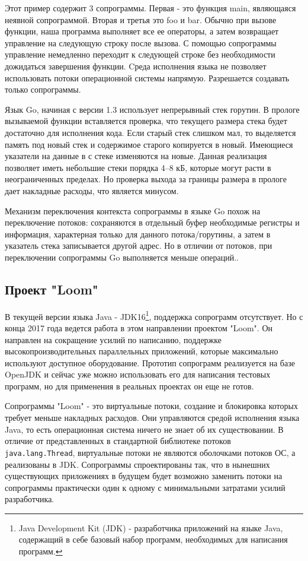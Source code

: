 	Этот пример содержит 3 сопрограммы. Первая - это функция main, являющаяся
	неявной сопрограммой. Вторая и третья это foo и bar. Обычно при вызове функции, наша программа 
	выполняет все ее операторы, а затем возвращает управление на следующую строку после вызова. 
	С помощью сопрограммы управление немедленно переходит к следующей строке без необходимости дожидаться завершения функции. Cреда исполнения языка не позволяет использовать потоки операционной системы
	напрямую. Разрешается создавать только сопрограммы.
	\par
	Язык Go, начиная с версии 1.3 использует непрерывный стек горутин. В прологе вызываемой функции вставляется проверка,
	что текущего размера стека будет достаточно для исполнения кода. Если старый стек слишком мал,
	то выделяется память под новый стек и содержимое старого копируется в новый. Имеющиеся указатели на
	данные в с стеке изменяются на новые. Данная реализация позволяет иметь небольшие стеки порядка 4--8 кБ, которые
	могут расти в неограниченных пределах. Но проверка выхода за границы размера в прологе дает накладные расходы,
	что является минусом. 
	\par 
	Механизм переключения контекста сопрограммы в языке Go похож на переключение потоков:
	сохраняются в отдельный буфер необходимые регистры и информация, характерная только для данного
	потока/горутины, а затем в указатель стека записывается другой адрес. Но в отличии от потоков, 
	при переключении сопрограммы Go выполняется меньше операций.\cite{go-context}.
	\clearpage
	
	\subsection{Проект "Loom"}
	В текущей версии языка Java - JDK16\footnote{Java Development Kit (JDK) - разработчика приложений на языке Java,
	содержащий в себе базовый набор программ, необходимых для написания программ.}, поддержка 
	сопрограмм отсутствует. Но с конца 2017 года ведется 
	работа в этом направлении проектом "Loom". Он направлен на сокращение усилий по написанию, поддержке
	высокопроизводительных параллельных приложений, которые максимально используют доступное
	оборудование\cite{loom-main}. Прототип сопрограмм реализуется на базе OpenJDK и сейчас уже можно использовать
	его для написания тестовых программ, но  для применения в реальных проектах он еще не готов.
	\par
	Сопрограммы "Loom" - это виртуальные потоки, создание и блокировка которых требует меньше накладных расходов\cite{loom-main}. Они управляются средой исполнения языка Java, то есть операционная
	система ничего не знает об их существовании. В отличие от представленных в стандартной библиотеке потоков
	\texttt{java.lang.Thread}, виртуальные потоки не являются оболочками потоков ОС, а реализованы в JDK.
	Сопрограммы спроектированы так, что в нынешних существующих приложениях в будущем будет
	возможно заменить потоки на сопрограммы практически один к одному с минимальными затратами усилий 
	разработчика.
	
